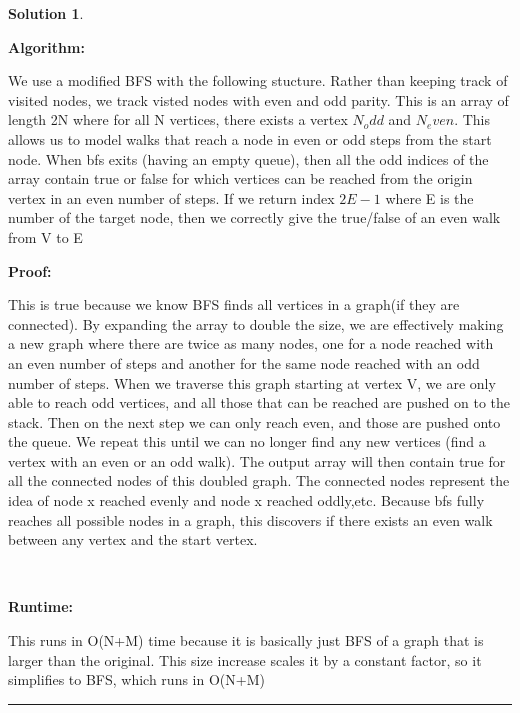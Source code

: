 \documentclass{article}
\theoremstyle{definition}
\def\fline{\rule{0.75\linewidth}{0.5pt}}
\newcommand{\finishline}{\begin{center}\fline\end{center}}
\newtheorem*{solution*}{Solution}
\newenvironment{solution}{\begin{solution*}}{{\finishline} \end{solution*}}
\begin{document}
\begin{solution}

    \

    \textbf{Algorithm: }
    \

    We use a modified BFS with the following stucture. Rather than keeping track of visited nodes, we track visted nodes with even and odd parity. This is an array of length 2N where for all N vertices, there exists a vertex $N_odd$ and $N_even$. This allows us to model walks that reach a node in even or odd steps from the start node.
    When bfs exits (having an empty queue), then all the odd indices of the array contain true or false for which vertices can be reached from the origin vertex in an even number of steps. 
    If we return index $2E-1$ where E is the number of the target node, then we correctly give the true/false of an even walk from V to E
    \

    \textbf{Proof: }
    \

    This is true because we know BFS finds all vertices in a graph(if they are connected). By expanding the array to double the size, we are effectively making a new graph where there are twice as many nodes, one for a node reached with an even number of steps and another for the same node reached with an odd number of steps. When we traverse this graph starting at vertex V, we are only able to reach odd vertices, and all those that can be reached are pushed on to the stack. Then on the next step we can only reach even, and those are pushed onto the queue. We repeat this until we can no longer find any new vertices (find a vertex with an even or an odd walk). The output array will then contain true for all the connected nodes of this doubled graph. The connected nodes represent the idea of node x reached evenly and node x reached oddly,etc. Because bfs fully reaches all possible nodes in a graph, this discovers if there exists an even  walk between any vertex and the start vertex. 

    \

    \textbf{Runtime: }

    This runs in O(N+M) time because it is basically just BFS of a graph that is larger than the original. This size increase scales it by a constant factor, so it simplifies to BFS, which runs in O(N+M) 
\end{solution}
\end{document}
